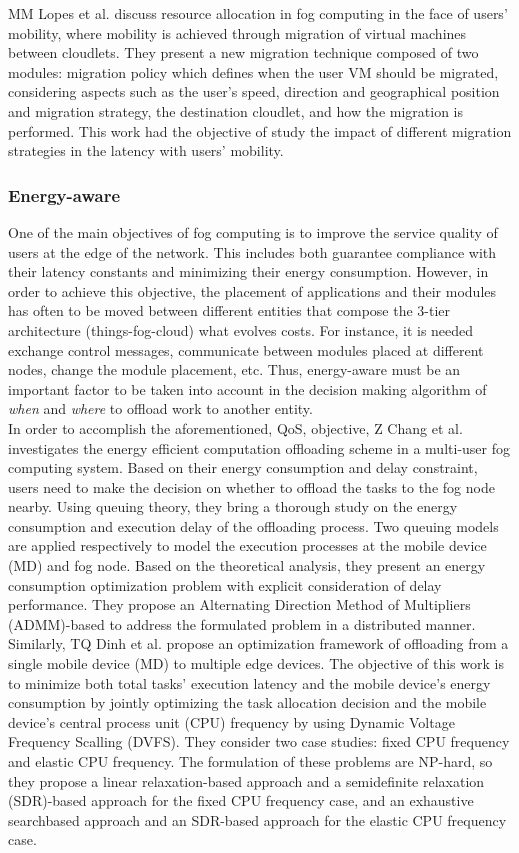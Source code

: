 MM Lopes et al. \cite{lopes2017myifogsim} discuss resource allocation in fog computing in the face of users’ mobility, where mobility is achieved through migration of virtual machines between cloudlets. They present a new migration technique composed of two modules: migration policy which defines when the user VM should be migrated, considering aspects such as the user's speed, direction and geographical position and migration strategy, the destination cloudlet, and how the migration is performed. This work had the objective of study the impact of different migration strategies in the latency with users’ mobility.

\subsubsection{Energy-aware}
One of the main objectives of fog computing is to improve the service quality of users at the edge of the network. This includes both guarantee compliance with their latency constants and minimizing their energy consumption. However, in order to achieve this objective, the placement of applications and their modules has often to be moved between different entities that compose the 3-tier architecture (things-fog-cloud) what evolves costs. For instance, it is needed exchange control messages, communicate between modules placed at different nodes, change the module placement, etc. Thus, energy-aware must be an important factor to be taken into account in the decision making algorithm of \textit{when} and \textit{where} to offload work to another entity.\\
\noindent\tab In order to accomplish the aforementioned, QoS, objective, Z Chang et al. \cite{chang2017energy} investigates the energy efficient computation offloading scheme in a multi-user fog computing system. Based on their energy consumption and delay constraint, users need to make the decision on whether to offload the tasks to the fog node nearby. Using queuing theory, they bring a thorough study on the energy consumption and execution delay of the offloading process. Two queuing models are applied respectively to model the execution processes at the mobile device (MD) and fog node. Based on the theoretical analysis, they present an energy consumption optimization problem with explicit consideration of delay performance. They propose an Alternating Direction Method of Multipliers (ADMM)-based to address the formulated problem in a distributed manner. Similarly, TQ Dinh et al. \cite{dinh2017offloading} propose an optimization framework of offloading from a single mobile device (MD) to multiple edge devices. The objective of this work is to minimize both total tasks’ execution latency and the mobile device’s energy consumption by jointly optimizing the task allocation decision and the mobile device’s central process unit (CPU) frequency by using Dynamic Voltage Frequency Scalling (DVFS). They consider two case studies: fixed CPU frequency and elastic CPU frequency. The formulation of these problems are NP-hard, so they propose a linear relaxation-based approach and a semidefinite relaxation (SDR)-based approach for the fixed CPU frequency case, and an exhaustive searchbased approach and an SDR-based approach for the elastic CPU frequency case.\\
